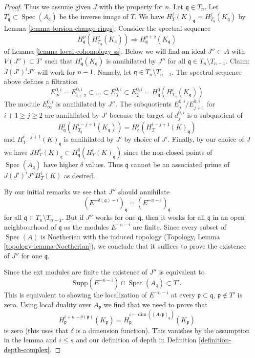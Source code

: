 \documentclass[10pt,a4paper]{amsart}
\theoremstyle{plain}
\theoremstyle{definition}
\theoremstyle{remark}
\numberwithin{equation}{subsection}
\def\Spec{\mathop{\mathrm{Spec}}}
\begin{document}
\begin{proof}
\medskip\noindent
Thus we assume given $J$ with the property for $n$.
Let $\mathfrak q \in T_n$. Let $T_\mathfrak q \subset \Spec(A_\mathfrak q)$
be the inverse image of $T$. We have
$H^j_T(K)_\mathfrak q = H^j_{T_\mathfrak q}(K_\mathfrak q)$
by Lemma \ref{lemma-torsion-change-rings}.
Consider the spectral sequence
$$
H_\mathfrak q^p(H^q_{T_\mathfrak q}(K_\mathfrak q))
\Rightarrow
H^{p + q}_\mathfrak q(K_\mathfrak q)
$$
of Lemma \ref{lemma-local-cohomology-ss}.
Below we will find an ideal $J'' \subset A$ with $V(J'') \subset T'$
such that $H^i_\mathfrak q(K_\mathfrak q)$ is annihilated by $J''$ for all
$\mathfrak q \in T_n \setminus T_{n - 1}$.
Claim: $J (J')^i J''$ will work for $n - 1$.
Namely, let $\mathfrak q \in T_n \setminus T_{n - 1}$.
The spectral sequence above defines a filtration
$$
E_\infty^{0, i} = E_{i + 2}^{0, i} \subset \ldots \subset E_3^{0, i} \subset
E_2^{0, i} = H^0_\mathfrak q(H^i_{T_\mathfrak q}(K_\mathfrak q))
$$
The module $E_\infty^{0, i}$ is annihilated by $J''$.
The subquotients $E_j^{0, i}/E_{j + 1}^{0, i}$ for $i + 1 \geq j \geq 2$
are annihilated by $J'$ because the target of $d_j^{0, i}$
is a subquotient of
$$
H^j_\mathfrak q(H^{i - j + 1}_{T_\mathfrak q}(K_\mathfrak q)) =
H^j_\mathfrak q(H^{i - j + 1}_T(K)_\mathfrak q)
$$
and $H^{i - j + 1}_T(K)_\mathfrak q$ is annihilated by $J'$ by choice of $J'$.
Finally, by our choice of $J$ we have
$J H^i_T(K)_\mathfrak q \subset H^0_\mathfrak q(H^i_T(K)_\mathfrak q)$
since the non-closed points of $\Spec(A_\mathfrak q)$ have higher
$\delta$ values. Thus $\mathfrak q$ cannot be an associated prime of
$J(J')^iJ'' H^i_T(K)$ as desired.

\medskip\noindent
By our initial remarks we see that $J''$ should annihilate
$$
(E^{-\delta(\mathfrak q) - i})_\mathfrak q =
(E^{-n - i})_\mathfrak q
$$
for all $\mathfrak q \in T_n \setminus T_{n - 1}$.
But if $J''$ works for one $\mathfrak q$, then it works for all
$\mathfrak q$ in an open neighbourhood of $\mathfrak q$
as the modules $E^{-n - i}$ are finite.
Since every subset of $\Spec(A)$ is Noetherian with the induced
topology (Topology, Lemma \ref{topology-lemma-Noetherian}),
we conclude that it suffices
to prove the existence of $J''$ for one $\mathfrak q$.

\medskip\noindent
Since the ext modules are finite the existence of $J''$ is
equivalent to
$$
\text{Supp}(E^{-n - i}) \cap \Spec(A_\mathfrak q) \subset T'.
$$
This is equivalent to showing the localization of $E^{-n - i}$ at every
$\mathfrak p \subset \mathfrak q$, $\mathfrak p \not \in T'$
is zero. Using local duality over $A_\mathfrak p$ we find that we need
to prove that
$$
H^{i + n - \delta(\mathfrak p)}_\mathfrak p(K_\mathfrak p) =
H^{i - \dim((A/\mathfrak p)_\mathfrak q)}_\mathfrak p(K_\mathfrak p)
$$
is zero (this uses that $\delta$ is a dimension function).
This vanishes by the assumption in the lemma and $i \leq s$ and
our definition of depth in Definition \ref{definition-depth-complex}.


\end{proof}
\end{document}
